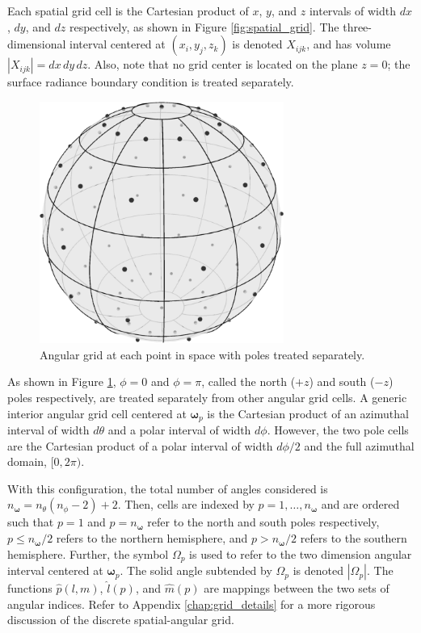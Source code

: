 \documentclass[ms,cpyr,lof,lot]{uathesis}
\newcommand\abs[1]{\left| #1 \right|}
\renewcommand\vec\bm
\newcommand\nomega{{n_{\vec{\omega}}}}
\begin{document}
Each spatial grid cell is the Cartesian product of $x$, $y$, and $z$ intervals of width $dx$, $dy$, and $dz$ respectively,
as shown in Figure \ref{fig:spatial_grid}.
The three-dimensional interval centered at $(x_i, y_j, z_k)$ is denoted $X_{ijk}$, and has volume $\abs{X_{ijk}}=dx\,dy\,dz$.
Also, note that no grid center is located on the plane $z=0$; the surface radiance boundary condition is treated separately.

\begin{figure}[H]
  \centering
  \includegraphics[width=8cm]{angulargrid.pdf}
  \caption{Angular grid at each point in space with poles treated separately.}
  \label{fig:angular_grid}
\end{figure}

As shown in Figure \ref{fig:angular_grid}, $\phi=0$ and $\phi=\pi$, called
the north ($+z$) and south ($-z$) poles respectively, are treated separately from other angular grid cells.
A generic interior angular grid cell centered at $\vec{\omega}_p$ is the Cartesian product of an azimuthal interval of width $d\theta$ and a polar interval of width $d\phi$.
However, the two pole cells are the Cartesian product of a polar interval of width $d\phi/2$ and the full azimuthal domain, $[0, 2\pi)$.

With this configuration, the total number of angles considered is $\nomega = n_\theta(n_\phi-2)+2$.
Then, cells are indexed by $p=1,\ldots,n_{\vec{\omega}}$ and are ordered such that
$p=1$ and $p=n_{\vec{\omega}}$ refer to the north and south poles respectively,
$p\leq\nomega/2$ refers to the northern hemisphere, and $p>\nomega/2$ refers to the southern hemisphere.
Further, the symbol $\Omega_p$ is used to refer to the two dimension angular interval centered at $\vec{\omega}_p$.
The solid angle subtended by $\Omega_p$ is denoted $\abs{\Omega_p}$.
The functions $\hat{p}(l,m)$, $\hat{l}(p)$, and $\hat{m}(p)$ are mappings between the two sets of angular indices.
Refer to Appendix \ref{chap:grid_details} for a more rigorous discussion of the discrete spatial-angular grid.
\end{document}
